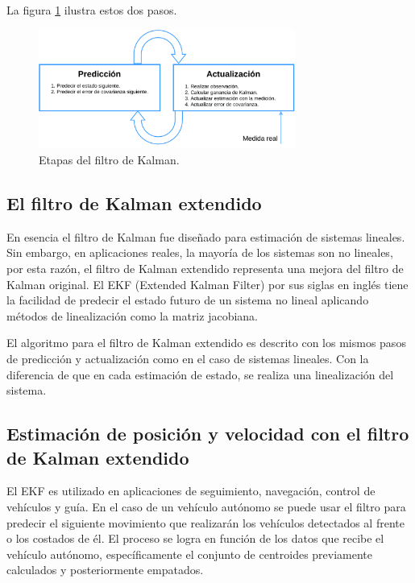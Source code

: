 La figura \ref{fig:kalman_filter_chart} ilustra estos dos pasos.
\begin{figure}[h]
    \centering
    \includegraphics[width=0.75\textwidth]{Figures/Figures_Cap05/kalman_filter_chart.pdf}
    \caption{Etapas del filtro de Kalman.}
    \label{fig:kalman_filter_chart}
\end{figure}

\subsection{El filtro de Kalman extendido} \label{sub:el_filtro_de_Kalman_extendido}

En esencia el filtro de Kalman fue diseñado para estimación de sistemas lineales. Sin embargo, en aplicaciones reales, la mayoría de los sistemas son no lineales, por esta razón, el filtro de Kalman extendido representa una mejora del filtro de Kalman original. El EKF (Extended Kalman Filter) por sus siglas en inglés tiene la facilidad de predecir el estado futuro de un sistema no lineal aplicando métodos de linealización como la matriz jacobiana.

El algoritmo para el filtro de Kalman extendido es descrito con los mismos pasos de predicción y actualización como en el caso de sistemas lineales. Con la diferencia de que en cada estimación de estado, se realiza una linealización del sistema.

\subsection{Estimación de posición y velocidad con el filtro de Kalman extendido} \label{sub:estimación_de_posición_y_velocidad_con_el_filtro_de_kalman_extendido}

El EKF es utilizado en aplicaciones de seguimiento, navegación, control de vehículos y guía. En el caso de un vehículo autónomo se puede usar el filtro para predecir el siguiente movimiento que realizarán los vehículos detectados al frente o los costados de él. El proceso se logra en función de los datos que recibe el vehículo autónomo, específicamente el conjunto de centroides previamente calculados y posteriormente empatados.

